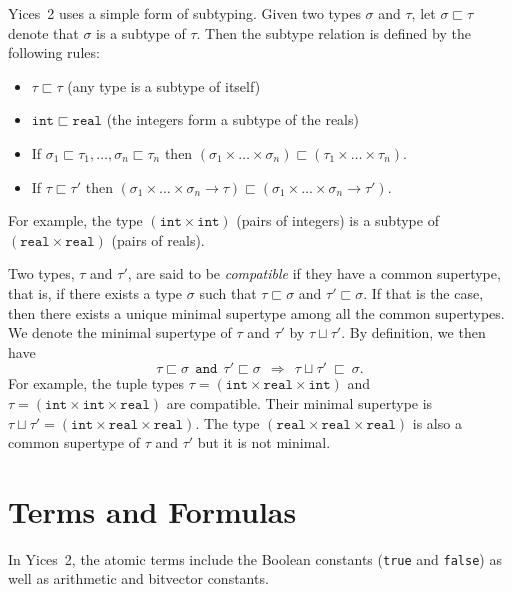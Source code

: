 \documentclass[11pt,twoside,fleqn,openright,titlepage]{cslreport}
\begin{document}
\medskip\noindent
Yices~2 uses a simple form  of subtyping. Given two types $\sigma$ and
$\tau$, let $\sigma\sqsubset\tau$ denote that $\sigma$ is a subtype of
$\tau$. Then the subtype relation is defined by the following rules:
\begin{itemize}
\item $\tau\sqsubset\tau$ (any type is a subtype of itself)
\item   $\mathtt{int}\sqsubset\mathtt{real}$  (the  integers   form  a
  subtype of the reals)
\item If $\sigma_1\sqsubset\tau_1,\ldots,\sigma_n\sqsubset\tau_n$ then
$(\sigma_1\times \ldots\times\sigma_n)\sqsubset (\tau_1\times\ldots\times\tau_n)$.
\item If $\tau\sqsubset\tau'$ then
  $(\sigma_1\times\ldots\times\sigma_n\rightarrow\tau)\sqsubset
  (\sigma_1\times\ldots\times\sigma_n\rightarrow\tau')$.
\end{itemize}
For  example, the  type  $(\mathtt{int}\times\mathtt{int})$ (pairs  of
integers) is a  subtype of $(\mathtt{real}\times\mathtt{real})$ (pairs
of reals).

\medskip\noindent
Two types,  $\tau$ and $\tau'$, are  said to be  {\em compatible\/} if
they have a common supertype, that is, if there exists a type $\sigma$
such that  $\tau\sqsubset\sigma$ and $\tau'\sqsubset\sigma$.   If that
is the  case, then there exists  a unique minimal  supertype among all
the common supertypes.  We denote the minimal supertype  of $\tau$ and
$\tau'$ by $\tau\sqcup\tau'$. By definition, we then have
$$\tau\sqsubset\sigma~~\mathtt{and}~~\tau'\sqsubset\sigma~~\Rightarrow~~\tau\sqcup\tau'\:\sqsubset\:\sigma.$$
For            example,           the            tuple           types
$\tau=(\mathtt{int}\times\mathtt{real}\times\mathtt{int})$          and
$\tau=(\mathtt{int}\times\mathtt{int}\times\mathtt{real})$          are
compatible.   Their   minimal    supertype   is   $\tau\sqcup\tau'   =
(\mathtt{int}\times\mathtt{real}\times\mathtt{real})$.     The    type
$(\mathtt{real}\times\mathtt{real}\times\mathtt{real})$   is   also  a
common supertype of $\tau$ and $\tau'$ but it is not minimal.


\section{Terms and Formulas}
\label{terms-and-formulas}

In   Yices~2,  the   atomic  terms   include  the   Boolean  constants
(\texttt{true} and \texttt{false}) as well as arithmetic and bitvector
constants.
\end{document}
